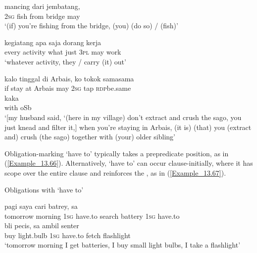 \ea
\label{Example_13.63}
 {mancing} {dari} {jembatang,} {}\\ %
 \textsc{2sg}  fish  from  bridge  may\\
 ‘(if) you’re fishing from the bridge, (you)  (do so) /  (fish)’ \textstyleExampleSource{[081025-003-Cv.0058]}
\z

\ea
\label{Example_13.64}
 {kegiatang} {apa} {saja} {dorang} {} {kerja}\\ %
 every  activity  what  just  \textsc{3pl}  may  work\\
\glt 
‘whatever activity, they  /  carry (it) out’ \textstyleExampleSource{[080923-007-Cv.0013]}
\z

\ea
\label{Example_13.65}
\gll {\ldots} {kalo} {tinggal} {di} {Arbais,} {} {ko} {tokok} {sama{\Tilde}sama}\\ %
  {}   if  stay  at  Arbais  may  \textsc{2sg}  tap  \textsc{rdp}{\Tilde}be.same\\
  {kaka}\\
 {with}  {oSb}\\
\glt 
‘[my husband said, ‘(here in my village) don’t extract and crush the sago, you just knead and filter it,] when you’re staying in Arbais, (it is)  (that) you (extract and) crush (the sago) together with (your) older sibling’ \textstyleExampleSource{[081014-007-CvEx.0058]}
\z


Obligation-marking  ‘have to’ typically takes a prepredicate position, as in (\ref{Example_13.66}). Alternatively,  ‘have to’ can occur clause-initially, where it has scope over the entire clause and reinforces the , as in (\ref{Example_13.67}).


\begin{styleExampleTitle}
Obligations with  ‘have to’
\end{styleExampleTitle}

\ea
\label{Example_13.66}
 {{pagi}} {{saya}} {{}} {{cari}} {batrey,} {sa} {}\\ %
 {tomorrow}  {morning}  {\textsc{1sg}}  {have.to}  {search}  battery  \textsc{1sg}  have.to\\
\gll bli  {pecis,}  {sa}  {}  {ambil}  {senter}\\
 buy  {light.bulb}  {\textsc{1sg}}  {have.to}  {fetch}  {flashlight}\\
 ‘tomorrow morning I  get batteries, I  buy small light bulbs, I  take a flashlight’ \textstyleExampleSource{[080919-004-NP.0003]}
\z

